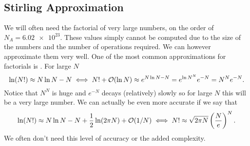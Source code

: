 \documentclass[a4paper]{article}
\begin{document}
    \subsection{Stirling Approximation}
    We will often need the factorial of very large numbers, on the order of \(N_A = \num{6.02e23}\).
    These values simply cannot be computed due to the size of the numbers and the number of operations required.
    We can however approximate them very well.
    One of the most common approximations for factorials is .
    For large \(N\)
    \[\ln(N!) \approx N\ln N - N \iff N! + \order{\ln N} \approx e^{N\ln N - N} = e^{\ln N^N}e^{-N} = N^Ne^{-N}.\]
    Notice that \(N^N\) is huge and \(e^{-N}\) decays (relatively) slowly so for large \(N\) this will be a very large number.
    We can actually be even more accurate if we say that
    \[\ln(N!) \approx N\ln N - N + \frac{1}{2}\ln(2\pi N) + \order{1/N} \iff N! \approx \sqrt{2\pi N}\left(\frac{N}{e}\right)^N.\]
    We often don't need this level of accuracy or the added complexity.
    
\end{document}
